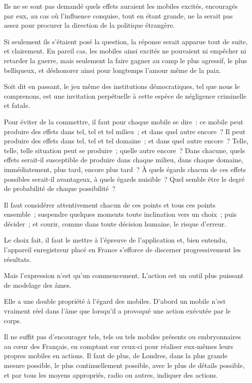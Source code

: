 \documentclass[french,twoside]{book} %
\begin{document}
Ils ne se sont pas demandé quels effets auraient les mobiles excités, encouragés par eux, au cas où l'influence conquise, tout en étant grande, ne la serait pas assez pour procurer la direction de la politique étrangère.\par
Si seulement ils s'étaient posé la question, la réponse serait apparue tout de suite, et clairement. En pareil cas, les mobiles ainsi excités ne pouvaient ni empêcher ni retarder la guerre, mais seulement la faire gagner au camp le plus agressif, le plus belliqueux, et déshonorer ainsi pour longtemps l'amour même de la paix.\par
Soit dit en passant, le jeu même des institutions démocratiques, tel que nous le comprenons, est une invitation perpétuelle à cette espèce de négligence criminelle et fatale.\par
Pour éviter de la commettre, il faut pour chaque mobile se dire : ce mobile peut produire des effets dans tel, tel et tel milieu ; et dans quel autre encore ? Il peut produire des effets dans tel, tel et tel domaine ; et dans quel autre encore ? Telle, telle, telle situation peut se produire ; quelle autre encore ? Dans chacune, quels effets serait-il susceptible de produire dans chaque milieu, dans chaque domaine, immédiatement, plus tard, encore plus tard ? À quels égards chacun de ces effets possibles serait-il avantageux, à quels égards nuisible ? Quel semble être le degré de probabilité de chaque possibilité ?\par
Il faut considérer attentivement chacun de ces points et tous ces points ensemble ; suspendre quelques moments toute inclination vers un choix ; puis décider ; et courir, comme dans toute décision humaine, le risque d'erreur.\par
Le choix fait, il faut le mettre à l'épreuve de l'application et, bien entendu, l'appareil enregistreur placé en France s'efforce de discerner progressivement les résultats.\par
Mais l'expression n'est qu'un commencement. L'action est un outil plus puissant de modelage des âmes.\par
Elle a une double propriété à l'égard des mobiles. D'abord un mobile n'est vraiment réel dans l'âme que lorsqu'il a provoqué une action exécutée par le corps.\par
Il ne suffit pas d'encourager tels, tels ou tels mobiles présents ou embryonnaires au cœur des Français, en comptant sur ceux-ci pour réaliser eux-mêmes leurs propres mobiles en actions. Il faut de plus, de Londres, dans la plus grande mesure possible, le plus continuellement possible, avec le plus de détails possible, et par tous les moyens appropriés, radio ou autres, indiquer des actions.\par
\end{document}
